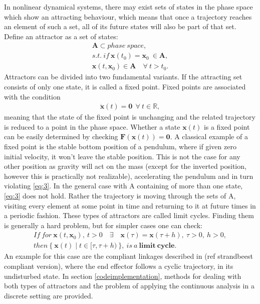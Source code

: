     In nonlinear dynamical systems, there may exist sets of states in the phase space which show an attracting behaviour, which means that once a trajectory reaches an element of such a set, all of its future states will also be part of that set. Define an attractor as a set of states:
    \begin{gather} \mathbf{A} \subset phase\ space,\\ s.t.\ if \ \mathbf{x}(t_0) = \mathbf{x}_0\ \in \mathbf{A}, \\ \mathbf{x}(t,\mathbf{x}_0) \in \mathbf{A}\quad \forall\ t > t_0. \label{eq:2} \end{gather}
    Attractors can be divided into two fundamental variants.
    If the attracting set consists of only one state, it is called a fixed point. Fixed points are associated with the condition
    \begin{gather}  \dot{\mathbf{x}}(t) = \mathbf{0}\ \ \forall \ t \in \mathbb{R}, \label{eq:3} \end{gather}
    meaning that the state of the fixed point is unchanging and the related trajectory is reduced to a point in the phase space. Whether a state $\mathbf{x}(t)$ is a fixed point can be easily determined by checking $\mathbf{F}(\mathbf{x}(t)) = \mathbf{0} \label{eq:4}$. A classical example of a fixed point is the stable bottom position of a pendulum, where if given zero initial velocity, it won't leave the stable position. This is not the case for any other position as gravity will act on the mass (except for the inverted position, however this is practically not realizable), accelerating the pendulum and in turn violating \ref{eq:3}.
    In the general case with A containing of more than one state, \ref{eq:3} does not hold. Rather the trajectory is moving through the sets of A, visiting every element at some point in time and returning to it at future times in a periodic fashion. These types of attractors are called limit cycles. Finding them is generally a hard problem, but for simpler cases one can check:
    \begin{gather} If\ for \ \mathbf{x}(t,\mathbf{x}_0) ,\ t > 0 \quad \exists \quad \mathbf{x}(\tau) = \mathbf{x}(\tau + h),\ \tau > 0,\ h > 0, \\then\ \{\ \mathbf{x}(t) \mid t \in [\tau,\tau + h)\ \}, \ is \ a\ \mathbf{limit\ cycle}.\label{eq:5} \end{gather}
    An example for this case are the compliant linkages described in (ref strandbeest compliant version), where the end effector follows a cyclic trajectory, in its undisturbed state. 
    In section \ref{codeimplementation}, methods for dealing with both types of attractors and the problem of applying the continuous analysis in a discrete setting are provided. 

